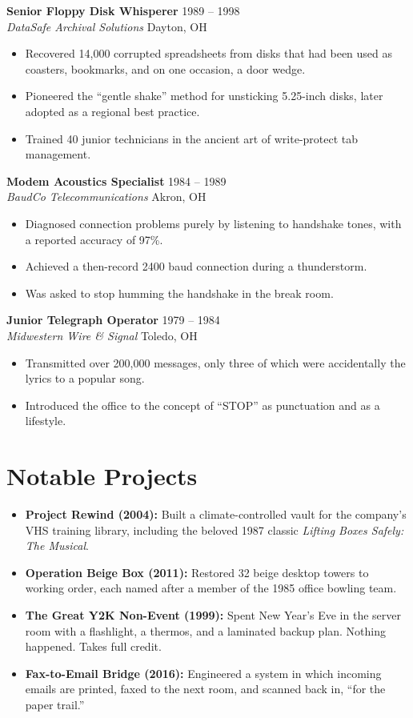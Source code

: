 \documentclass[10pt]{article}
\newcommand{\role}[4]{%
  \textbf{#1} \hfill {\color{muted}#3}\\
  \textit{#2} \hfill {\color{muted}\small #4}\par\vspace{2pt}}
\begin{document}
\role{Senior Floppy Disk Whisperer}{DataSafe Archival Solutions}{1989 -- 1998}{Dayton, OH}
\begin{itemize}
  \item Recovered 14,000 corrupted spreadsheets from disks that had been
        used as coasters, bookmarks, and on one occasion, a door wedge.
  \item Pioneered the ``gentle shake'' method for unsticking 5.25-inch
        disks, later adopted as a regional best practice.
  \item Trained 40 junior technicians in the ancient art of write-protect
        tab management.
\end{itemize}

\role{Modem Acoustics Specialist}{BaudCo Telecommunications}{1984 -- 1989}{Akron, OH}
\begin{itemize}
  \item Diagnosed connection problems purely by listening to handshake
        tones, with a reported accuracy of 97\%.
  \item Achieved a then-record 2400 baud connection during a thunderstorm.
  \item Was asked to stop humming the handshake in the break room.
\end{itemize}

\role{Junior Telegraph Operator}{Midwestern Wire \& Signal}{1979 -- 1984}{Toledo, OH}
\begin{itemize}
  \item Transmitted over 200,000 messages, only three of which were
        accidentally the lyrics to a popular song.
  \item Introduced the office to the concept of ``STOP'' as punctuation
        and as a lifestyle.
\end{itemize}



\section{Notable Projects}
\begin{itemize}
  \item \textbf{Project Rewind (2004):} Built a climate-controlled vault for
        the company's VHS training library, including the beloved 1987
        classic \emph{Lifting Boxes Safely: The Musical}.
  \item \textbf{Operation Beige Box (2011):} Restored 32 beige desktop towers
        to working order, each named after a member of the 1985 office
        bowling team.
  \item \textbf{The Great Y2K Non-Event (1999):} Spent New Year's Eve in the
        server room with a flashlight, a thermos, and a laminated backup
        plan. Nothing happened. Takes full credit.
  \item \textbf{Fax-to-Email Bridge (2016):} Engineered a system in which
        incoming emails are printed, faxed to the next room, and scanned
        back in, ``for the paper trail.''
\end{itemize}
\end{document}
